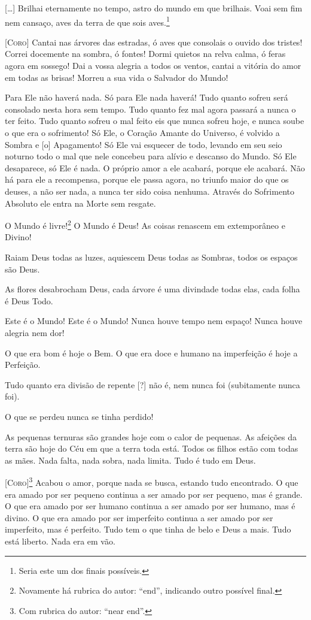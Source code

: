 \bigskip

[\ldots{}] Brilhai eternamente no tempo, astro do mundo em que brilhais. Voai sem
fim nem cansaço, aves da terra de que sois aves.\footnote{ Seria este
um dos finais possíveis.}

\textsc{[Coro]} Cantai nas árvores das estradas, ó aves que consolais o
ouvido dos tristes! Correi
docemente na sombra, ó fontes! Dormi quietos na relva calma, ó feras
agora em sossego! Dai a vossa alegria a todos os ventos, cantai a
vitória do amor em todas as brisas! Morreu a sua vida o Salvador do
Mundo! 

Para Ele não haverá nada. Só para Ele nada haverá! Tudo quanto sofreu
será consolado nesta hora sem tempo. Tudo quanto fez mal agora
passará a nunca o ter feito. Tudo quanto sofreu o mal feito eis que
nunca sofreu hoje, e nunca soube o que era o sofrimento! Só Ele, o
Coração Amante do Universo, é volvido a Sombra e [o] Apagamento! Só
Ele vai esquecer de todo, levando em seu seio noturno todo o mal que
nele concebeu para alívio e descanso do Mundo. Só Ele desaparece, só
Ele é nada. O próprio amor a ele acabará, porque ele acabará. Não há
para ele a recompensa, porque ele passa agora, no triunfo maior do
que os deuses, a não ser nada, a nunca ter sido coisa nenhuma.
Através do Sofrimento Absoluto ele entra na Morte sem resgate.

O Mundo é livre!\footnote{ Novamente há rubrica do autor: “end”,
indicando outro possível final.} O Mundo é Deus! As coisas renascem
em extemporâneo e Divino!

Raiam Deus todas as luzes, aquiescem Deus todas as Sombras, todos os
espaços são Deus.

As flores desabrocham Deus, cada árvore é uma divindade todas elas,
cada folha é Deus Todo.

Este é o Mundo! Este é o Mundo! Nunca houve tempo nem espaço! Nunca
houve alegria nem dor!

O que era bom é hoje o Bem. O que era doce e humano na imperfeição é
hoje a Perfeição.

Tudo quanto era divisão de repente [?] não é, nem nunca foi
(subitamente nunca foi).

O que se perdeu nunca se tinha perdido!

As pequenas ternuras são grandes hoje com o calor de pequenas. As
afeições da terra são hoje do Céu em que a terra toda está. Todos os
filhos estão com todas as mães. Nada falta, nada sobra, nada limita.
Tudo é tudo em Deus.

\textsc{[Coro]\footnote{ Com rubrica do autor: ``near end''.}} Acabou o amor,
porque nada se busca, estando tudo encontrado. O que era amado por
ser pequeno continua a ser amado por ser pequeno, mas é grande. O que
era amado por ser humano continua a ser amado por ser humano, mas é
divino. O que era amado por ser imperfeito continua a ser amado por
ser imperfeito, mas é perfeito. Tudo tem o que tinha de belo e Deus a
mais. Tudo está liberto. Nada era em vão.


